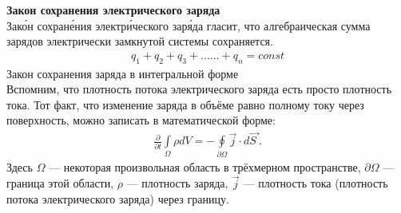 \textbf{Закон сохранения электрического заряда}\\
Зако́н сохране́ния электри́ческого заря́да гласит, что алгебраическая сумма зарядов электрически замкнутой системы сохраняется.
\begin{gather*}
 q_{1}+q_{2}+q_{3}+......+q_{n}=const
 \end{gather*}
 Закон сохранения заряда в интегральной форме\\
 Вспомним, что плотность потока электрического заряда есть просто плотность тока. Тот факт, что изменение заряда в объёме равно полному току через поверхность, можно записать в математической форме:
 \begin{gather*}
 	{\displaystyle {\frac {\partial }{\partial t}}\int \limits _{\Omega }\rho dV=-\oint \limits _{\partial \Omega }{\vec {j}}\cdot d{\vec {S\ }}.}
 \end{gather*}
 Здесь $\Omega$  — некоторая произвольная область в трёхмерном пространстве, $\partial \Omega$  — граница этой области, $\rho$  — плотность заряда, $\vec{j}$ — плотность тока (плотность потока электрического заряда) через границу.





